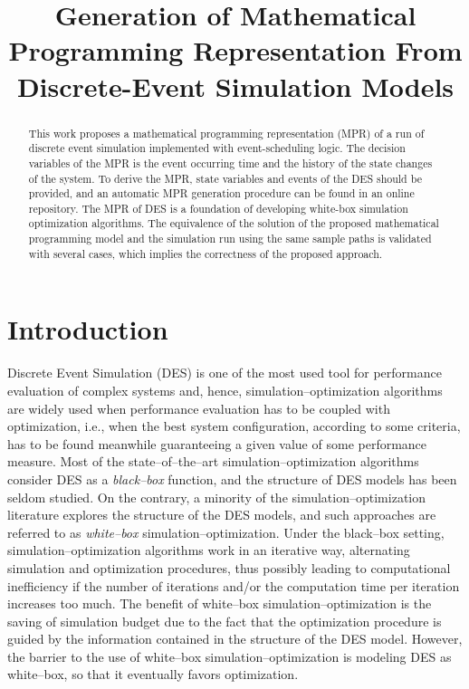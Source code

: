 \documentclass[]{interact}
\theoremstyle{plain}%
\theoremstyle{definition}
\theoremstyle{remark}
\begin{document}

\title{Generation of Mathematical Programming Representation From Discrete-Event Simulation Models}
\maketitle
\begin{abstract}
This work proposes a mathematical programming representation (MPR) of a run of discrete event simulation implemented with event-scheduling logic. The decision variables of the MPR is the event occurring time and the history of the state changes of the system. To derive the MPR, state variables and events of the DES should be provided, and an automatic MPR generation procedure can be found in an online repository. The MPR of DES is a foundation of developing white-box simulation optimization algorithms. The equivalence of the solution of the proposed mathematical programming model and the simulation run using the same sample paths is validated with several cases, which implies the correctness of the proposed approach. 
\end{abstract}

\section{Introduction}
Discrete Event Simulation (DES) is one of the most used tool for performance evaluation of %
complex systems and, hence, simulation--optimization algorithms are widely used %
when performance evaluation has to be coupled with optimization, i.e., when the best system configuration, according to some criteria, has to be found meanwhile guaranteeing a given value of some performance measure.  
Most of the state--of--the--art simulation--optimization algorithms consider DES as a \textit{black--box} function, and the structure of DES models has been seldom studied. On the contrary, a minority of the simulation--optimization literature explores the structure of the DES models, and %
such approaches are referred to as \textit{white--box} simulation--optimization. 
Under the black--box setting, simulation--optimization algorithms work in an iterative way, alternating simulation and optimization procedures, 
thus possibly leading to computational inefficiency if the number of iterations and/or the computation time per iteration increases too much. 
The benefit of white--box simulation--optimization is the saving of simulation budget due to the fact that %
the optimization procedure is guided by the information contained in the structure of the DES model. However, the barrier to the use of white--box simulation--optimization is modeling DES as white--box, so that it eventually favors optimization. 
\end{document}
